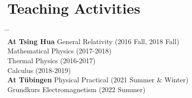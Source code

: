 \documentclass[10pt,floatfix,a4paper]{article}
\begin{document}
\section*{Teaching Activities}
\begin{tabbing}
  \hspace*{10mm} \= \hspace*{2.8cm} \= \hspace*{10cm} \\[-3ex]
  \> \textbf{At Tsing Hua} \> General Relativity (2016 Fall, 2018 Fall)\\
  \> \> Mathematical Physics (2017-2018) \\
  \> \> Thermal Physics (2016-2017) \\
  \> \> Calculus (2018-2019) \\
  \> \textbf{At T{\"u}bingen} \> Physical Practical (2021 Summer \& Winter)\\
  \> \> Grundkurs Electromagnetism (2022 Summer)
\end{tabbing}



\iffalse
\end{document}

